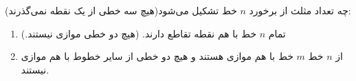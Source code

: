 \EXERCISE
چه تعداد مثلث از برخورد
$n$
خط تشکیل می‌شود(هیچ سه خطی از یک نقطه نمی‌گذرند):
\begin{enumerate}
\item
تمام
$n$
خط با هم نقطه تقاطع دارند. (هیچ دو خطی موازی نیستند.)
\item
از
$n$
خط
$m$
خط با هم موازی هستند و هیچ دو خطی از سایر خطوط با هم موازی نیستند.
\end{enumerate}